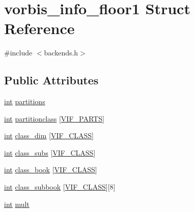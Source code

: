 \hypertarget{structvorbis__info__floor1}{}\section{vorbis\+\_\+info\+\_\+floor1 Struct Reference}
\label{structvorbis__info__floor1}


{\ttfamily \#include $<$backends.\+h$>$}

\subsection*{Public Attributes}
\begin{DoxyCompactItemize}
\item 
\hyperlink{xmltok_8h_a5a0d4a5641ce434f1d23533f2b2e6653}{int} \hyperlink{structvorbis__info__floor1_a0888c238296237fca49e63f4c684b4b1}{partitions}
\item 
\hyperlink{xmltok_8h_a5a0d4a5641ce434f1d23533f2b2e6653}{int} \hyperlink{structvorbis__info__floor1_a2e4121f3de34efb3d3092cfacd9e1913}{partitionclass} \mbox{[}\hyperlink{backends_8h_a1297a1cb19f7dcbe72b56122d724fba9}{V\+I\+F\+\_\+\+P\+A\+R\+TS}\mbox{]}
\item 
\hyperlink{xmltok_8h_a5a0d4a5641ce434f1d23533f2b2e6653}{int} \hyperlink{structvorbis__info__floor1_aafa4ec3e13ed54e77effbd1c2f550e00}{class\+\_\+dim} \mbox{[}\hyperlink{backends_8h_a41c574f8551e2c431da346b36580918c}{V\+I\+F\+\_\+\+C\+L\+A\+SS}\mbox{]}
\item 
\hyperlink{xmltok_8h_a5a0d4a5641ce434f1d23533f2b2e6653}{int} \hyperlink{structvorbis__info__floor1_a22f4b03eb391dcdceebbe2675195f38a}{class\+\_\+subs} \mbox{[}\hyperlink{backends_8h_a41c574f8551e2c431da346b36580918c}{V\+I\+F\+\_\+\+C\+L\+A\+SS}\mbox{]}
\item 
\hyperlink{xmltok_8h_a5a0d4a5641ce434f1d23533f2b2e6653}{int} \hyperlink{structvorbis__info__floor1_a4765de87c6afc7a526684e1f1210556d}{class\+\_\+book} \mbox{[}\hyperlink{backends_8h_a41c574f8551e2c431da346b36580918c}{V\+I\+F\+\_\+\+C\+L\+A\+SS}\mbox{]}
\item 
\hyperlink{xmltok_8h_a5a0d4a5641ce434f1d23533f2b2e6653}{int} \hyperlink{structvorbis__info__floor1_a87236d836164ba5c67ba79ec90e67fae}{class\+\_\+subbook} \mbox{[}\hyperlink{backends_8h_a41c574f8551e2c431da346b36580918c}{V\+I\+F\+\_\+\+C\+L\+A\+SS}\mbox{]}\mbox{[}8\mbox{]}
\item 
\hyperlink{xmltok_8h_a5a0d4a5641ce434f1d23533f2b2e6653}{int} \hyperlink{structvorbis__info__floor1_a431d5bb1a6aec9746726cfdf737d5ac0}{mult}

\end{DoxyCompactItemize}
